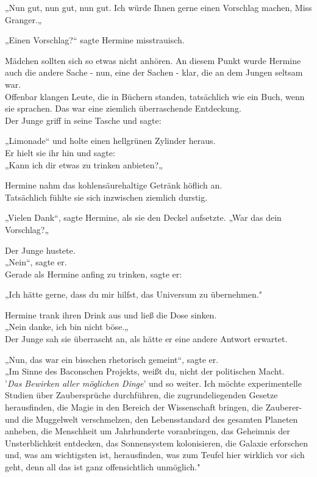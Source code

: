 {„Nun gut, nun gut, nun gut. Ich würde Ihnen gerne einen Vorschlag machen, Miss Granger.„

„Einen Vorschlag?“ sagte Hermine misstrauisch.

Mädchen sollten sich so etwas nicht anhören. An diesem Punkt wurde Hermine auch die andere Sache - nun, eine der Sachen - klar, die an dem Jungen seltsam war.\\ Offenbar klangen Leute, die in Büchern standen, tatsächlich wie ein Buch, wenn sie sprachen. Das war eine ziemlich überraschende Entdeckung.\\ Der Junge griff in seine Tasche und sagte:

„Limonade“ und holte einen hellgrünen Zylinder heraus.\\ Er hielt sie ihr hin und sagte:\\ „Kann ich dir etwas zu trinken anbieten?„

Hermine nahm das kohlensäurehaltige Getränk höflich an.\\ Tatsächlich fühlte sie sich inzwischen ziemlich durstig.

„Vielen Dank“, sagte Hermine, als sie den Deckel aufsetzte. „War das dein Vorschlag?„

Der Junge hustete.\\ „Nein“, sagte er.\\ Gerade als Hermine anfing zu trinken, sagte er:

„Ich hätte gerne, dass du mir hilfst, das Universum zu übernehmen."

Hermine trank ihren Drink aus und ließ die Dose sinken.\\ „Nein danke, ich bin nicht böse.„\\ Der Junge sah sie überrascht an, als hätte er eine andere Antwort erwartet.

„Nun, das war ein bisschen rhetorisch gemeint“, sagte er.\\ „Im Sinne des Baconschen Projekts, weißt du, nicht der politischen Macht.\\ '\emph{Das Bewirken aller möglichen Dinge}' und so weiter. Ich möchte experimentelle Studien über Zaubersprüche durchführen, die zugrundeliegenden Gesetze herausfinden, die Magie in den Bereich der Wissenschaft bringen, die Zauberer- und die Muggelwelt verschmelzen, den Lebensstandard des gesamten Planeten anheben, die Menschheit um Jahrhunderte voranbringen, das Geheimnis der Unsterblichkeit entdecken, das Sonnensystem kolonisieren, die Galaxie erforschen und, was am wichtigsten ist, herausfinden, was zum Teufel hier wirklich vor sich geht, denn all das ist ganz offensichtlich unmöglich."

}
